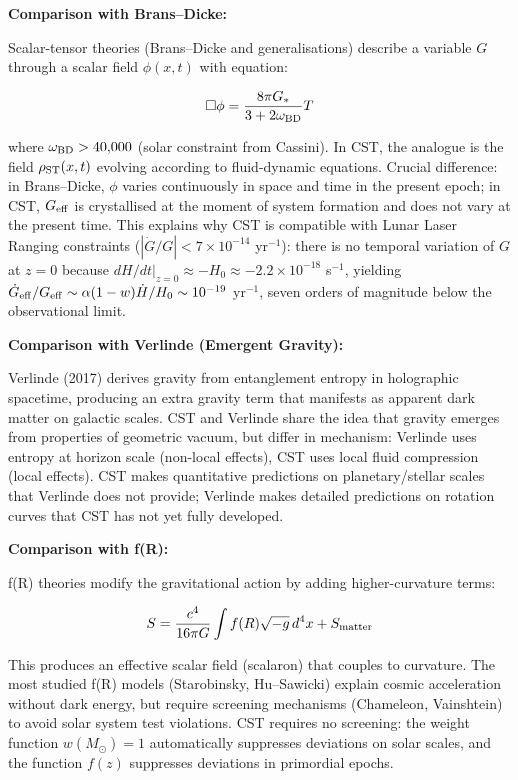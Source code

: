 \documentclass[11pt,a4paper]{article}
\begin{document}
\textbf{Comparison with Brans--Dicke:}

Scalar-tensor theories (Brans--Dicke and generalisations) describe a
variable \(G\) through a scalar field \(\phi(x,t)\) with equation:

\[\Box\phi = \frac{8\pi G_*}{3+2\omega_{\rm BD}} T\]

where \(\omega_{\rm BD} > 40{,}000\) (solar constraint from Cassini). In
CST, the analogue is the field \(\rho_{\rm ST}(x,t)\) evolving according
to fluid-dynamic equations. Crucial difference: in Brans--Dicke,
\(\phi\) varies continuously in space and time in the present epoch; in
CST, \(G_{\rm eff}\) is crystallised at the moment of system formation
and does not vary at the present time. This explains why CST is
compatible with Lunar Laser Ranging constraints
(\(|\dot G/G| < 7\times10^{-14}\) yr\(^{-1}\)): there is no temporal
variation of \(G\) at \(z = 0\) because
\(dH/dt|_{z=0} \approx -H_0 \approx -2.2\times10^{-18}\) s\(^{-1}\),
yielding
\(\dot G_{\rm eff}/G_{\rm eff} \sim \alpha (1-w) \dot H/H_0 \sim 10^{-19}\)
yr\(^{-1}\), seven orders of magnitude below the observational limit.

\textbf{Comparison with Verlinde (Emergent Gravity):}

Verlinde (2017) derives gravity from entanglement entropy in holographic
spacetime, producing an extra gravity term that manifests as apparent
dark matter on galactic scales. CST and Verlinde share the idea that
gravity emerges from properties of geometric vacuum, but differ in
mechanism: Verlinde uses entropy at horizon scale (non-local effects),
CST uses local fluid compression (local effects). CST makes quantitative
predictions on planetary/stellar scales that Verlinde does not provide;
Verlinde makes detailed predictions on rotation curves that CST has not
yet fully developed.

\textbf{Comparison with f(R):}

f(R) theories modify the gravitational action by adding higher-curvature
terms:

\[S = \frac{c^4}{16\pi G}\int f(R)\sqrt{-g}\,d^4x + S_{\rm matter}\]

This produces an effective scalar field (scalaron) that couples to
curvature. The most studied f(R) models (Starobinsky, Hu--Sawicki)
explain cosmic acceleration without dark energy, but require screening
mechanisms (Chameleon, Vainshtein) to avoid solar system test
violations. CST requires no screening: the weight function
\(w(M_\odot) = 1\) automatically suppresses deviations on solar scales,
and the function \(f(z)\) suppresses deviations in primordial epochs.
\end{document}
